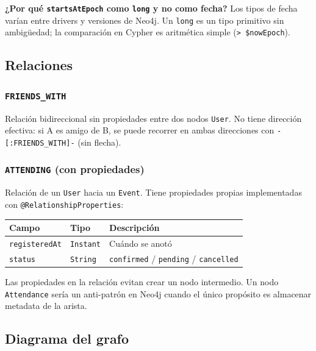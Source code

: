 \documentclass[12pt, a4paper]{article}
\newcommand{\code}[1]{\texttt{#1}}
\begin{document}
\vspace{0.5em}
\textbf{¿Por qué \code{startsAtEpoch} como \code{long} y no como fecha?}
Los tipos de fecha varían entre drivers y versiones de Neo4j. Un
\code{long} es un tipo primitivo sin ambigüedad; la comparación en Cypher
es aritmética simple (\code{> \$nowEpoch}).

\subsection{Relaciones}

\subsubsection{\code{FRIENDS\_WITH}}

Relación bidireccional sin propiedades entre dos nodos \code{User}.
No tiene dirección efectiva: si A es amigo de B, se puede recorrer en ambas
direcciones con \code{-[:FRIENDS\_WITH]-} (sin flecha).

\subsubsection{\code{ATTENDING} (con propiedades)}

Relación de un \code{User} hacia un \code{Event}. Tiene propiedades propias
implementadas con \code{@RelationshipProperties}:

\begin{tabularx}{\textwidth}{@{}llX@{}}
  \toprule
  \textbf{Campo}       & \textbf{Tipo}     & \textbf{Descripción} \\
  \midrule
  \code{registeredAt}  & \code{Instant}    & Cuándo se anotó \\
  \code{status}        & \code{String}     & \code{confirmed} / \code{pending} / \code{cancelled} \\
  \bottomrule
\end{tabularx}

\vspace{0.5em}
Las propiedades en la relación evitan crear un nodo intermedio.
Un nodo \code{Attendance} sería un anti-patrón en Neo4j cuando el
único propósito es almacenar metadata de la arista.

\subsection{Diagrama del grafo}
\end{document}
